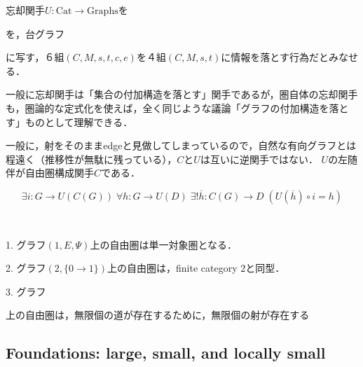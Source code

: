 \documentclass[uplatex, dvipdfmx]{jsarticle}
\begin{document}
\begin{definition*}[圏の忘却関手]
    忘却関手$U:\mathrm{Cat}\to \mathrm{Graphs}$を
    \begin{center}\end{center}
    を，台グラフ
    \begin{center}\end{center}
    に写す，６組$(C,M,s,t,c,e)$を４組$(C,M,s,t)$に情報を落とす行為だとみなせる．
\end{definition*}
\begin{remark*}
    一般に忘却関手は「集合の付加構造を落とす」関手であるが，圏自体の忘却関手も，圏論的な定式化を使えば，全く同じような議論「グラフの付加構造を落とす」ものとして理解できる．

    一般に，射をそのままedgeと見做してしまっているので，自然な有向グラフとは程遠く（推移性が無駄に残っている），$C$と$U$は互いに逆関手ではない．
    $U$の左随伴が自由圏構成関手$C$である．
\end{remark*}

\begin{definition*}[自由圏の普遍性]
    \[ \exists i:G\to U(C(G))\; \forall h:G\to U(D) \; \exists !\overline{h}:C(G)\to D\; (U(\overline{h})\circ i=h) \]
\end{definition*}
\begin{example*}　

    1. グラフ$(1, E, \Psi)$上の自由圏は単一対象圏となる．

    2. グラフ$(2, \{0\to 1\})$上の自由圏は，finite category $2$と同型．

    3. グラフ\begin{center}
    \end{center}上の自由圏は，無限個の道が存在するために，無限個の射が存在する
\end{example*}

\subsection{Foundations: large, small, and locally small}
\end{document}
